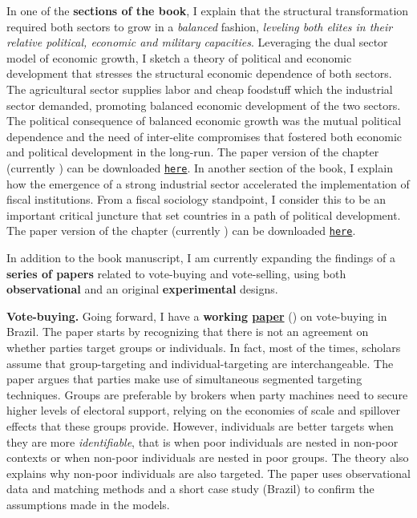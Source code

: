 \documentclass[10pt,stdletter,dateno,sigleft]{newlfm} %
\begin{document}
\begin{newlfm}
In one of the {\bf sections of the book}, I explain that the structural transformation required both sectors to grow in a \emph{balanced} fashion, \emph{leveling both elites in their relative political, economic and military capacities}. Leveraging the dual sector model of economic growth, I sketch a theory of political and economic development that stresses the structural economic dependence of both sectors. The agricultural sector supplies labor and cheap foodstuff which the industrial sector demanded, promoting balanced economic development of the two sectors. The political consequence of balanced economic growth was the mutual political dependence and the need of inter-elite compromises that fostered both economic and political development in the long-run. The paper version of the chapter (currently \emph{\unskip}) can be downloaded \href{https://github.com/hbahamonde/Negative_Link_Paper/raw/master/Bahamonde_NegativeLink.pdf}{\texttt{here}}. In another section of the book, I explain how the emergence of a strong industrial sector accelerated the implementation of fiscal institutions. From a fiscal sociology standpoint, I consider this to be an important critical juncture that set countries in a path of political development. The paper version of the chapter (currently \emph{\unskip}) can be downloaded \href{http://github.com/hbahamonde/IncomeTaxAdoption/raw/master/Bahamonde_IncomeTaxAdoption.pdf}{\texttt{here}}. 


In addition to the book manuscript, I am currently expanding the findings of a {\bf series of papers} related to vote-buying and vote-selling, using both {\bf observational} and an original {\bf experimental} designs. 



{\bf Vote-buying.} Going forward, I have a {\bf working \href{https://github.com/hbahamonde/Clientelism_paper/raw/master/Bahamonde_Clientelism_Paper.pdf}{paper}} (\emph{\unskip}) on vote-buying in Brazil. The paper starts by recognizing that there is not an agreement on whether parties target groups or individuals. In fact, most of the times, scholars assume that group-targeting and individual-targeting are interchangeable. The paper argues that parties make use of simultaneous segmented targeting techniques. Groups are preferable by brokers when party machines need to secure higher levels of electoral support, relying on the economies of scale and spillover effects that these groups provide. However, individuals are better targets when they are more \emph{identifiable}, that is when poor individuals are nested in non-poor contexts or when non-poor individuals are nested in poor groups. The theory also explains why non-poor individuals are also targeted. The paper uses observational data and matching methods and a short case study (Brazil) to confirm the assumptions made in the models.


\end{newlfm}
\end{document}
